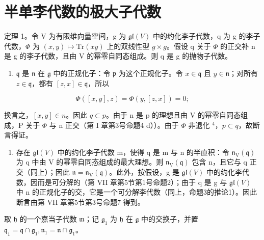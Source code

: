 \section{半单李代数的极大子代数}

定理 1。令 V 为有限维向量空间，g 为 \(\mathfrak{gl}(V)\) 中的约化李子代数，q 为 g 的李子代数，\(\Phi\) 为 \((x,y)\mapsto\mathrm{Tr}(xy)\) 上的双线性型 \(g\times g\)。假设 q 关于 \(\Phi\) 的正交补 n 是 g 的李子代数，且由 V 的幂零自同态组成。则 q 是 g 的抛物子代数。

\begin{enumerate}
\def\labelenumi{\alph{enumi})}
\tightlist
\item
  \(\mathfrak{q}\) 是 \(\mathfrak{n}\) 在 \(\mathfrak{g}\) 中的正规化子：令 \(\mathfrak{p}\) 为这个正规化子。令 \(x \in \mathfrak{q}\) 且 \(y \in \mathfrak{n}\)；对所有 \(z \in \mathfrak{q}\)，都有 \([z, x] \in \mathfrak{q}\)，所以
\end{enumerate}

\[
\Phi ([ x, y ], z) = \Phi (y, [ z, x ]) = 0;
\]

换言之，\([x,y] \in n\)。因此 \(q \subset p\)。由于 n 是 p 的理想且由 V 的幂零自同态组成，P 关于 \(\varPhi\) 与 n 正交（第 I 章第3号命题4 d））。由于 \(\varPhi\) 非退化 \(^{4}\)，\(p \subset q\)，故断言得证。

\begin{enumerate}
\def\labelenumi{\alph{enumi})}
\setcounter{enumi}{1}
\tightlist
\item
  存在 \(\mathfrak{gl}(V)\) 中的约化李子代数 m，使得 q 是 m 与 n 的半直积：令 \(\mathfrak{n}_{\mathrm{V}}(\mathfrak{q})\) 为 q 中由 V 的幂零自同态组成的最大理想。则 \(\mathfrak{n}_{\mathrm{V}}(\mathfrak{q})\) 包含 n，且它与 q 正交（同上）；因此 \(\mathfrak{n} = \mathfrak{n}_{\mathrm{V}}(\mathfrak{q})\)。此外，按假设，g 是 \(\mathfrak{gl}(V)\) 中的约化李代数，因而是可分解的（第 VII 章第5节第1号命题2）；由于 q 是 g 与 \(\mathfrak{gl}(V)\) 中 n 的正规化子的交，它是一个可分解李代数（同上，命题3的推论1）。因此断言由第 VII 章第5节第3号命题7 得到。
\end{enumerate}

取 \(\mathfrak{h}\) 的一个嘉当子代数 \(\mathfrak{m}\)；记 \(\mathfrak{g}_1\) 为 \(\mathfrak{h}\) 在 \(\mathfrak{g}\) 中的交换子，并置 \(\mathfrak{q}_1 = \mathfrak{q} \cap \mathfrak{g}_1, \mathfrak{n}_1 = \mathfrak{n} \cap \mathfrak{g}_1\)。

